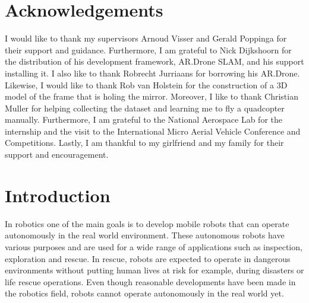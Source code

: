 \documentclass[a4paper]{article}
\begin{document}
\section*{Acknowledgements}
I would like to thank my supervisors Arnoud Visser and Gerald Poppinga for their support and guidance. Furthermore, I am grateful to Nick Dijkshoorn for the distribution of his development framework, AR.Drone SLAM, and his support installing it. I also like to thank Robrecht Jurriaans for borrowing his AR.Drone. Likewise, I would like to thank Rob van Holstein for the construction of a 3D model of the frame that is holing the mirror. Moreover, I like to thank Christian Muller for helping collecting the dataset and learning me to fly a quadcopter manually. Furthermore, I am grateful to the National Aerospace Lab for the internship and the visit to the International Micro Aerial Vehicle Conference and Competitions. Lastly, I am thankful to my girlfriend and my family for their support and encouragement.
\newpage

\thispagestyle{empty}
\tableofcontents
\newpage
\setcounter{page}{1}

\section{Introduction}
In robotics one of the main goals is to develop mobile robots that can operate autonomously in the real world environment. These autonomous robots have various purposes and are used for a wide range of applications such as inspection, exploration and rescue. In rescue, robots are expected to operate in dangerous environments without putting human lives at risk for example, during disasters or life rescue operations. Even though reasonable developments have been made in the robotics field, robots cannot operate autonomously in the real world yet.
\end{document}
